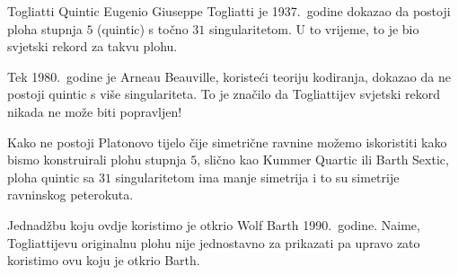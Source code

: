 \begin{surferPage}{Togliatti Quintic}
		Eugenio Giuseppe Togliatti je 1937.\ godine dokazao da postoji ploha stupnja $5$ (quintic) s to\v cno $31$ singularitetom. U to vrijeme, to je bio svjetski rekord za takvu plohu.
		
		
		Tek 1980.\ godine je Arneau Beauville, koriste\' ci teoriju kodiranja, dokazao da ne postoji quintic s vi\v se singulariteta.
		To je zna\v cilo da Togliattijev svjetski rekord nikada ne mo\v ze biti popravljen!
		
		Kako ne postoji Platonovo tijelo \v cije simetri\v cne ravnine mo\v zemo iskoristiti
		kako bismo konstruirali plohu stupnja $5$, sli\v cno kao Kummer Quartic ili Barth Sextic, ploha quintic sa $31$ singularitetom ima manje simetrija i to su simetrije ravninskog peterokuta.
		
		
Jednad\v zbu koju ovdje koristimo je otkrio Wolf Barth 1990.\ godine. Naime, Togliattijevu originalnu plohu nije jednostavno za prikazati pa upravo zato koristimo ovu koju je otkrio Barth.
\end{surferPage}
